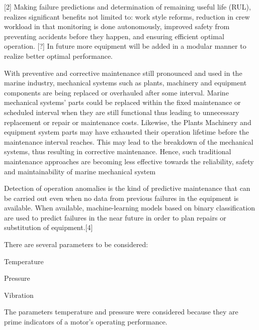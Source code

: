 [2] Making failure predictions and determination of remaining useful life (RUL), realizes significant benefits not limited to: work style reforms, reduction in crew workload in that monitoring is done autonomously, improved safety from preventing accidents before they happen, and ensuring efficient optimal operation. [?] In future more equipment will be added in a modular manner to realize better optimal performance.  

With preventive and corrective maintenance still pronounced and used in the marine industry, mechanical systems such as plants, machinery and equipment components are being replaced or overhauled after some interval. Marine mechanical systems’ parts could be replaced within the fixed maintenance or scheduled interval when they are still functional thus leading to unnecessary replacement or repair or maintenance costs. Likewise, the Plants Machinery and equipment system parts may have exhausted their operation lifetime before the maintenance interval reaches. This may lead to the breakdown of the mechanical systems, thus resulting in corrective maintenance. Hence, such traditional maintenance approaches are becoming less effective towards the reliability, safety and maintainability of marine mechanical system 

Detection of operation anomalies is the kind of predictive maintenance that can be carried out even when no data from previous failures in the equipment is available. When available, machine-learning models based on binary classification are used to predict failures in the near future in order to plan repairs or substitution of equipment.[4] 

There are several parameters to be considered: 

Temperature 

Pressure 

Vibration 

The parameters temperature and pressure were considered because they are prime indicators of a motor’s operating performance. 

